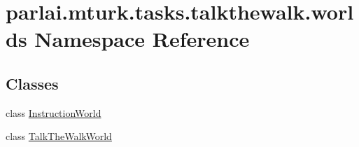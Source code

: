 \hypertarget{namespaceparlai_1_1mturk_1_1tasks_1_1talkthewalk_1_1worlds}{}\section{parlai.\+mturk.\+tasks.\+talkthewalk.\+worlds Namespace Reference}
\label{namespaceparlai_1_1mturk_1_1tasks_1_1talkthewalk_1_1worlds}
\subsection*{Classes}
\begin{DoxyCompactItemize}
\item 
class \hyperlink{classparlai_1_1mturk_1_1tasks_1_1talkthewalk_1_1worlds_1_1InstructionWorld}{Instruction\+World}
\item 
class \hyperlink{classparlai_1_1mturk_1_1tasks_1_1talkthewalk_1_1worlds_1_1TalkTheWalkWorld}{Talk\+The\+Walk\+World}
\end{DoxyCompactItemize}
